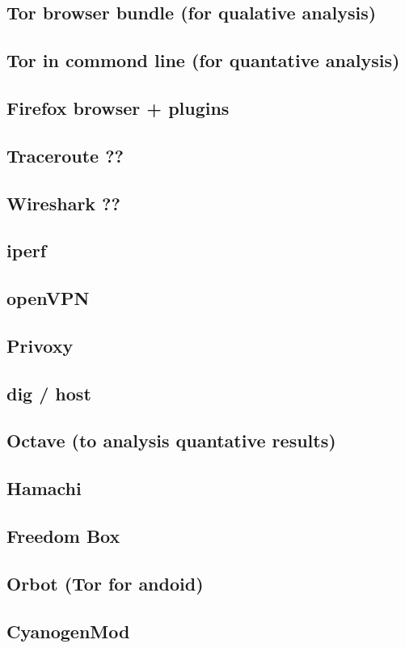 \documentclass[12pt,a4paper,oneside]{article}
\begin{document}
\subsection{Tor browser bundle (for qualative analysis)}
\subsection{Tor in commond line (for quantative analysis)}
\subsection{Firefox browser + plugins}
\subsection{Traceroute ??}
\subsection{Wireshark ??}
\subsection{iperf}
\subsection{openVPN}
\subsection{Privoxy}
\subsection{dig / host}
\subsection{Octave (to analysis quantative results)}
\subsection{Hamachi}
\subsection{Freedom Box}
\subsection{Orbot (Tor for andoid)}
\subsection{CyanogenMod}
\end{document}
